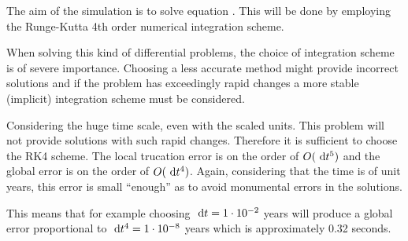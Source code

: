 The aim of the simulation is to solve equation
. This will be done by employing the
Runge-Kutta 4th order numerical integration scheme.

When solving this kind of differential problems, the choice of
integration scheme is of severe importance. Choosing a less
accurate method might provide incorrect solutions and if the
problem has exceedingly rapid changes a more stable (implicit)
integration scheme must be considered.

Considering the huge time scale, even with the scaled units. This
problem will not provide solutions with such rapid changes.
Therefore it is sufficient to choose the RK4 scheme. The local
trucation error is on the order of $O(\ \mathrm{d}t^5)$ and the global error
is on the order of $O(\ \mathrm{d}t^4)$. Again, considering that the time is
of unit years, this error is small ``enough'' as to avoid
monumental errors in the solutions.

This means that for example choosing $\ \mathrm{d}t = 1 \cdot 10^{-2}$ years
will produce a global error proportional to $\ \mathrm{d}t^4 = 1 \cdot
10^{-8}$ years which is approximately 0.32 seconds.
